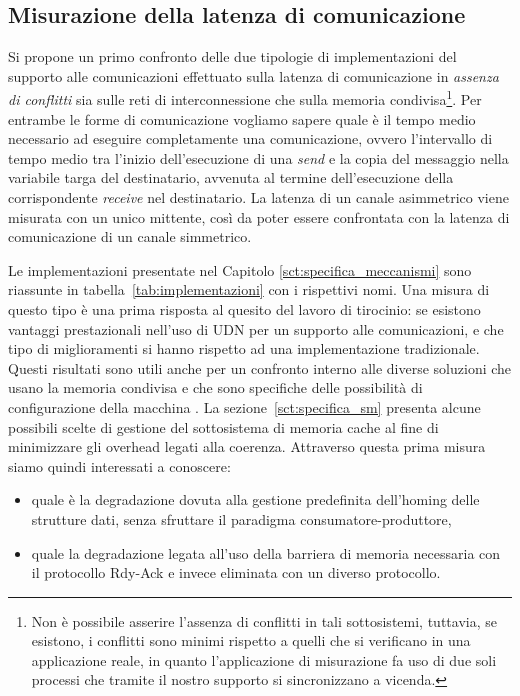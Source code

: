 \subsection{Misurazione della latenza di comunicazione}
\label{sct:meter}
Si propone un primo confronto delle due tipologie di implementazioni del supporto alle comunicazioni effettuato sulla latenza di comunicazione in \emph{assenza di conflitti} sia sulle reti di interconnessione che sulla memoria condivisa\footnote{Non \`e possibile asserire l'assenza di conflitti in tali sottosistemi, tuttavia, se esistono, i conflitti sono minimi rispetto a quelli che si verificano in una applicazione reale, in quanto l'applicazione di misurazione fa uso di due soli processi che tramite il nostro supporto si sincronizzano a vicenda.}. Per entrambe le forme di comunicazione vogliamo sapere quale \`e il tempo medio necessario ad eseguire completamente una comunicazione, ovvero l'intervallo di tempo medio tra l'inizio dell'esecuzione di una \emph{send} e la copia del messaggio nella variabile targa del destinatario, avvenuta al termine dell'esecuzione della corrispondente \emph{receive} nel destinatario. La latenza di un canale asimmetrico viene misurata con un unico mittente, cos\`i da poter essere confrontata con la latenza di comunicazione di un canale simmetrico. 

Le implementazioni presentate nel Capitolo \ref{sct:specifica_meccanismi} sono riassunte in tabella~\ref{tab:implementazioni} con i rispettivi nomi. 
Una misura di questo tipo \`e una prima risposta al quesito del lavoro di tirocinio: se esistono vantaggi prestazionali nell'uso di UDN per un supporto alle comunicazioni, e che tipo di miglioramenti si hanno rispetto ad una implementazione tradizionale. Questi risultati sono utili anche per un confronto interno alle diverse soluzioni che usano la memoria condivisa e che sono specifiche delle possibilit\`a di configurazione della macchina \tile. La sezione~\ref{sct:specifica_sm} presenta alcune possibili scelte di gestione del sottosistema di memoria cache al fine di minimizzare gli overhead legati alla coerenza. Attraverso questa prima misura siamo quindi interessati a conoscere:
\begin{itemize}
\item quale \`e la degradazione dovuta alla gestione predefinita dell'homing delle strutture dati, senza sfruttare il paradigma consumatore-produttore,
\item quale la degradazione legata all'uso della barriera di memoria necessaria con il protocollo Rdy-Ack e invece eliminata con un diverso protocollo.
\end{itemize}


